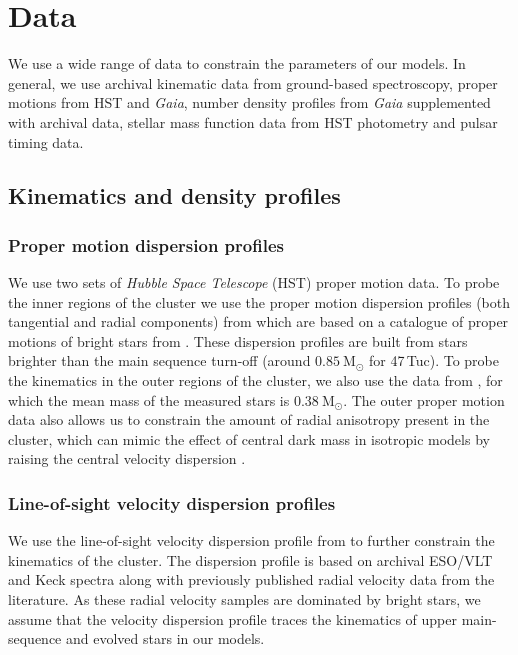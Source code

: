 \newcommand{\evolvemf}{\code{evolve\_mf}}



\section{Data}


We use a wide range of data to constrain the parameters of our models. In general, we use archival
kinematic data from ground-based spectroscopy, proper motions from HST and \emph{Gaia}, number
density profiles from \emph{Gaia} supplemented with archival data, stellar mass function data from
HST photometry and pulsar timing data.

\subsection{Kinematics and density profiles}

\subsubsection{Proper motion dispersion profiles}

We use two sets of {\it Hubble Space Telescope} (HST) proper motion data. To probe the inner regions
of the cluster we use the proper motion dispersion profiles (both tangential and radial components)
from \citet{Watkins2015} which are based on a catalogue of proper motions of bright stars from
\citet{Bellini2014}. These dispersion profiles are built from stars brighter than the main sequence
turn-off (around $0.85 \ \mathrm{M}_\odot$  for 47\,Tuc). To probe the kinematics in the outer
regions of the cluster, we also use the data from \citet{Heyl2017}, for which the mean mass of the
measured stars is $0.38 \ \mathrm{M}_{\odot}$. The outer proper motion data also allows us to
constrain the amount of radial anisotropy present in the cluster, which can mimic the effect of
central dark mass in isotropic models by raising the central velocity dispersion \citep{Zocchi2017}.


\subsubsection{Line-of-sight velocity dispersion profiles}

We use the line-of-sight velocity dispersion profile from \citet{Baumgardt2018} to further constrain
the kinematics of the cluster. The dispersion profile is based on archival ESO/VLT and Keck spectra
along with previously published radial velocity data from the literature. As these radial velocity
samples are dominated by bright stars, we assume that the velocity dispersion profile traces the
kinematics of upper main-sequence and evolved stars in our models.

